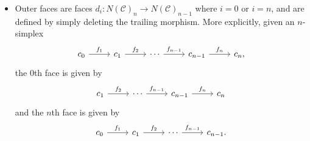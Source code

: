 \begin{definition}
\begin{itemize}
\begin{itemize}
\[\begin{tikzcd}[row sep = 2.5em, column sep = 2.5em]
			\end{tikzcd}\]
		\item Outer faces are faces $d_i : N(\mathcal{C} )_n \to N(\mathcal{C} )_{n-1} $ where $i=0$ or $i=n$, and are defined by simply deleting the trailing morphism. More explicitly, given an $n$-simplex
			\[\begin{tikzcd}[row sep = 2.5em, column sep = 2.5em]
			c_0 \ar[" f_1 ", r]  & c_1 \ar[" f_2 ", r]  & \cdots \ar[" f_{n-1}  ", r] & c_{n-1} \ar[" f_n ", r]  & c_n,
			\end{tikzcd}\]
			the 0th face is given by
			\[\begin{tikzcd}[row sep = 2.5em, column sep = 2.5em]
			 c_1 \ar[" f_2 ", r]  & \cdots \ar[" f_{n-1}  ", r] & c_{n-1} \ar[" f_n ", r]  & c_n
			\end{tikzcd}\]
			and the $n$th face is given by
			\[\begin{tikzcd}[row sep = 2.5em, column sep = 2.5em]
			c_0 \ar[" f_1 ", r]  & c_1 \ar[" f_2 ", r]  & \cdots \ar[" f_{n-1}  ", r] & c_{n-1} .
			\end{tikzcd}\]
			\end{itemize}
	\end{itemize}
\end{definition}

